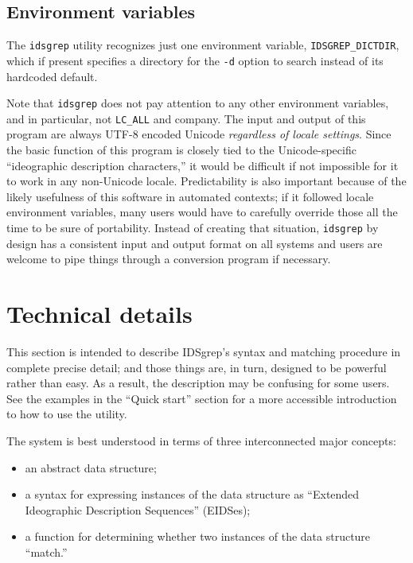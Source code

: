 \documentclass[twocolumn]{report}
\begin{document}

\section{Environment variables}

The \texttt{idsgrep} utility recognizes just one environment variable,
\texttt{IDSGREP\_DICTDIR}, which if present specifies a directory for the
\texttt{-d} option to search instead of its hardcoded default.

Note that \texttt{idsgrep} does not pay attention to any other environment
variables, and in particular, not \texttt{LC\_ALL} and company.  The input
and output of this program are always UTF-8 encoded Unicode \emph{regardless
of locale settings}.  Since the basic function of this program is closely
tied to the Unicode-specific ``ideographic description characters,'' it
would be difficult if not impossible for it to work in any non-Unicode
locale.  Predictability is also important because of the likely usefulness
of this software in automated contexts; if it followed locale environment
variables, many users would have to carefully override those all the time to
be sure of portability.  Instead of creating that situation,
\texttt{idsgrep} by design has a consistent input and output format on all
systems and users are welcome to pipe things through
a conversion program if necessary.


\chapter{Technical details}

\noindent

This section is intended to describe IDSgrep's syntax and matching procedure
in complete precise detail; and those things are, in turn, designed to be
powerful rather than easy.  As a result, the description may be confusing
for some users.  See the examples in the ``Quick start'' section for a more
accessible introduction to how to use the utility.

The system is best understood in terms of three interconnected major
concepts:
\begin{itemize}
  \item an abstract data structure;
  \item a syntax for expressing instances of the data structure as
    ``Extended Ideographic Description Sequences'' (EIDSes);
  \item a function for determining whether two instances of the data
    structure ``match.''
\end{itemize}
\end{document}
